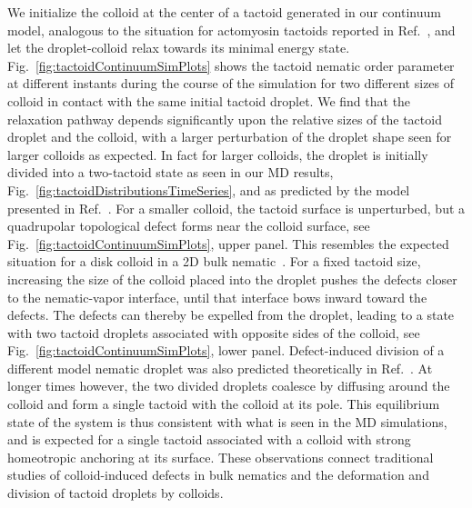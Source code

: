 \documentclass[%
 aip,
 amsmath,amssymb,
 reprint,%
]{revtex4-1}
\begin{document}
We initialize the colloid at the center of a tactoid generated in our continuum model, analogous to the situation for actomyosin tactoids reported in Ref.~, and let the droplet-colloid relax towards its minimal energy state. Fig.~\ref{fig:tactoidContinuumSimPlots} shows the tactoid nematic order parameter at different instants during the course of the simulation for two different sizes of colloid in contact with the same initial tactoid droplet. We find that the relaxation pathway depends significantly upon the relative sizes of the tactoid droplet and the colloid, with a larger perturbation of the droplet shape seen for larger colloids as expected. In fact for larger colloids, the droplet is initially divided into a two-tactoid state as seen in our MD results, Fig.~\ref{fig:tactoidDistributionsTimeSeries}, and as predicted by the model presented in Ref.~.  For a smaller colloid, the tactoid surface is unperturbed, but a quadrupolar topological defect forms near the colloid surface, see Fig.~\ref{fig:tactoidContinuumSimPlots}, upper panel. This resembles the expected situation for a disk colloid in a 2D bulk nematic~\cite{Silvestre04}. For a fixed tactoid size, increasing the size of the colloid placed into the droplet pushes the defects closer to the nematic-vapor interface, until that interface bows inward toward the defects. The defects can thereby be expelled from the droplet, leading to a state with two tactoid droplets associated with opposite sides of the colloid, see Fig.~\ref{fig:tactoidContinuumSimPlots}, lower panel.  Defect-induced division of a different model nematic droplet was also predicted theoretically in Ref.~. At longer times however, the two divided droplets coalesce by diffusing around the colloid and form a single tactoid with the colloid at its pole. This equilibrium state of the system is thus consistent with what is seen in the MD simulations, and is expected for a single tactoid associated with a colloid with strong homeotropic anchoring at its surface.  These observations connect traditional studies of colloid-induced defects in bulk nematics and the deformation and division of tactoid droplets by colloids.
\end{document}

